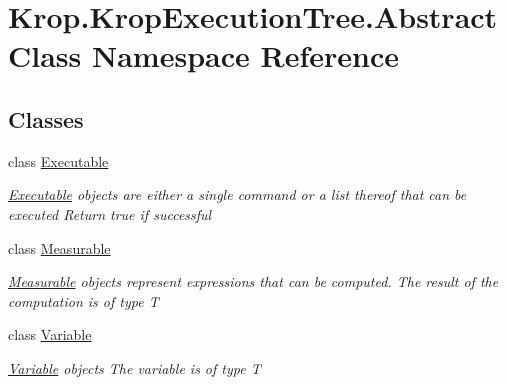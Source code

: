 \hypertarget{namespace_krop_1_1_krop_execution_tree_1_1_abstract_class}{}\section{Krop.\+Krop\+Execution\+Tree.\+Abstract\+Class Namespace Reference}
\label{namespace_krop_1_1_krop_execution_tree_1_1_abstract_class}
\subsection*{Classes}
\begin{DoxyCompactItemize}
\item 
class \mbox{\hyperlink{class_krop_1_1_krop_execution_tree_1_1_abstract_class_1_1_executable}{Executable}}
\begin{DoxyCompactList}\small\item\em \mbox{\hyperlink{class_krop_1_1_krop_execution_tree_1_1_abstract_class_1_1_executable}{Executable}} objects are either a single command or a list thereof that can be executed Return true if successful \end{DoxyCompactList}\item 
class \mbox{\hyperlink{class_krop_1_1_krop_execution_tree_1_1_abstract_class_1_1_measurable}{Measurable}}
\begin{DoxyCompactList}\small\item\em \mbox{\hyperlink{class_krop_1_1_krop_execution_tree_1_1_abstract_class_1_1_measurable}{Measurable}} objects represent expressions that can be computed. The result of the computation is of type T \end{DoxyCompactList}\item 
class \mbox{\hyperlink{class_krop_1_1_krop_execution_tree_1_1_abstract_class_1_1_variable}{Variable}}
\begin{DoxyCompactList}\small\item\em \mbox{\hyperlink{class_krop_1_1_krop_execution_tree_1_1_abstract_class_1_1_variable}{Variable}} objects The variable is of type T \end{DoxyCompactList}\end{DoxyCompactItemize}
